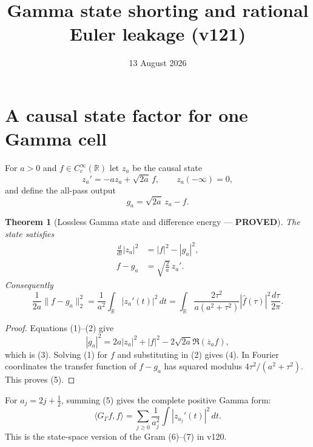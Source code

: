 \documentclass[11pt]{article}
\title{Gamma state shorting and rational Euler leakage (v121)}
\date{13 August 2026}
\newcommand{\PROVED}{\textcolor{green!40!black}{\textbf{PROVED}}}
\newtheorem{theorem}{Theorem}
\begin{document}
\maketitle

\section{A causal state factor for one Gamma cell}

For $a>0$ and $f\in C_c^\infty(\mathbb R)$ let $z_a$ be the causal state
\begin{equation}
 z_a'=-az_a+\sqrt{2a}\,f,\qquad z_a(-\infty)=0,              \tag{1}
\end{equation}
and define the all-pass output
\begin{equation}
 g_a=\sqrt{2a}\,z_a-f.                                      \tag{2}
\end{equation}

\begin{theorem}[Lossless Gamma state and difference energy --- \PROVED]
The state satisfies
\begin{align}
 \frac d{dt}|z_a|^2&=|f|^2-|g_a|^2,                         \tag{3}\\
 f-g_a&=\sqrt{\frac2a}\,z_a'.                               \tag{4}
\end{align}
Consequently
\begin{equation}
 \boxed{
 \frac1{2a}\|f-g_a\|_2^2
 =\frac1{a^2}\int_{\mathbb R}|z_a'(t)|^2\,dt
 =\int_{\mathbb R}
   \frac{2\tau^2}{a(a^2+\tau^2)}
   |\widehat f(\tau)|^2\frac{d\tau}{2\pi}.}                 \tag{5}
\end{equation}
\end{theorem}

\begin{proof}
Equations (1)--(2) give
\[
 |g_a|^2=2a|z_a|^2+|f|^2-2\sqrt{2a}\Re(\overline z_af),
\]
which is (3).  Solving (1) for $f$ and substituting in (2) gives (4).
In Fourier coordinates the transfer function of $f-g_a$ has squared
modulus $4\tau^2/(a^2+\tau^2)$.  This proves (5).
\end{proof}

For $a_j=2j+\frac12$, summing (5) gives the complete positive Gamma form:
\begin{equation}
 \langle G_\Gamma f,f\rangle
 =\sum_{j\ge0}\frac1{a_j^2}\int|z_{a_j}'(t)|^2\,dt.          \tag{6}
\end{equation}
This is the state-space version of the Gram (6)--(7) in v120.
\end{document}
